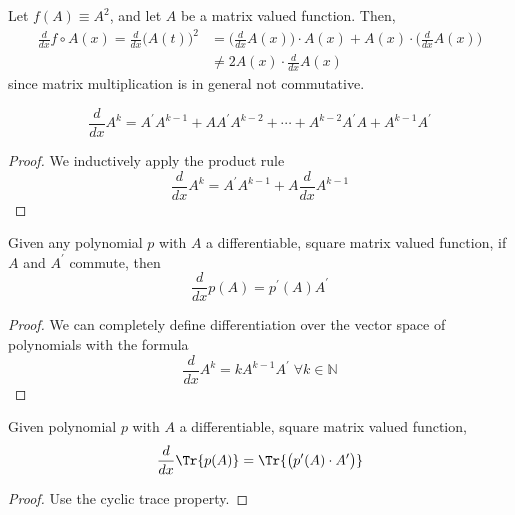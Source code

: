   \begin{example}
    Let $f(A) \equiv A^2$, and let $A$ be a matrix valued function. Then, 
    \begin{align*}
      \frac{d}{d x} f \circ A(x) = \frac{d}{d x} \big( A(t) \big)^2 & = \bigg( \frac{d}{d x} A(x) \bigg) \cdot A(x) + A(x) \cdot \bigg( \frac{d}{d x} A(x) \bigg) \\
      & \neq 2 A(x) \cdot \frac{d}{d x} A(x)
    \end{align*}
    since matrix multiplication is in general not commutative. 
  \end{example}

  \begin{theorem}
    \begin{equation}
      \frac{d}{d x} A^k = A^\prime A^{k-1} + A A^\prime A^{k-2} + \cdots + A^{k-2} A^\prime A + A^{k-1} A^\prime
    \end{equation}
  \end{theorem}
  \begin{proof}
    We inductively apply the product rule
    \begin{equation}
      \frac{d}{d x} A^k = A^\prime A^{k-1} + A \frac{d}{d x} A^{k-1}
    \end{equation}
  \end{proof}

  \begin{corollary}
    Given any polynomial $p$ with $A$ a differentiable, square matrix valued function, if $A$ and $A^\prime$ commute, then 
    \begin{equation}
      \frac{d}{d x} p(A) = p^\prime (A) A^\prime
    \end{equation}
  \end{corollary}
  \begin{proof}
    We can completely define differentiation over the vector space of polynomials with the formula
    \begin{equation}
      \frac{d}{d x} A^k = k A^{k-1} A^\prime \; \forall k \in \mathbb{N}
    \end{equation}
  \end{proof}

  \begin{corollary}
    Given polynomial $p$ with $A$ a differentiable, square matrix valued function, 
    \begin{equation}
      \frac{d}{d x} \Tr{p(A)} = \Tr{\big( p^\prime(A) \cdot A^\prime \big)}
    \end{equation}
  \end{corollary}
  \begin{proof}
    Use the cyclic trace property.
  \end{proof}

